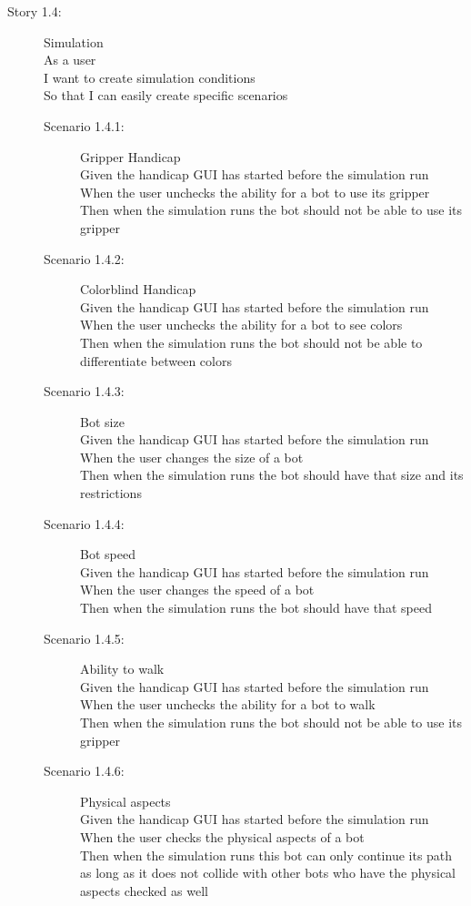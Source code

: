 \begin{description}
	\item[Story 1.4:] Simulation\\
	As a user\\
	I want to create simulation conditions\\
	So that I can easily create specific scenarios
	
	\begin{description}
		\item[Scenario 1.4.1:] Gripper Handicap\\
		Given the handicap GUI has started before the simulation run\\
		When the user unchecks the ability for a bot to use its gripper\\
		Then when the simulation runs the bot should not be able to use its gripper

		\item[Scenario 1.4.2:] Colorblind Handicap\\
		Given the handicap GUI has started before the simulation run\\
		When the user unchecks the ability for a bot to see colors\\
		Then when the simulation runs the bot should not be able to differentiate between colors

		\item[Scenario 1.4.3:] Bot size\\
		Given the handicap GUI has started before the simulation run\\
		When the user changes the size of a bot\\
		Then when the simulation runs the bot should have that size and its restrictions

		\item[Scenario 1.4.4:] Bot speed\\
		Given the handicap GUI has started before the simulation run\\
		When the user changes the speed of a bot\\
		Then when the simulation runs the bot should have that speed

		\item[Scenario 1.4.5:] Ability to walk\\
		Given the handicap GUI has started before the simulation run\\
		When the user unchecks the ability for a bot to walk\\
		Then when the simulation runs the bot should not be able to use its gripper

		\item[Scenario 1.4.6:] Physical aspects\\
		Given the handicap GUI has started before the simulation run\\
		When the user checks the physical aspects of a bot\\
		Then when the simulation runs this bot can only continue its path as long as it does not collide with other bots who have the physical aspects checked as well
	\end{description}
\end{description}

